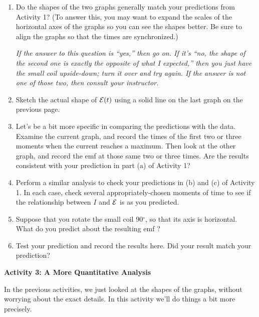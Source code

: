 \begin{enumerate}[labparts]
\item Do the shapes of the
two graphs generally match your predictions from Activity 1? (To answer this, you may want to expand the scales of the horizontal axes of the graphs so you can see the shapes better.  Be sure to align the graphs so that the times are synchronized.) 

\answerspace{1in}

\textit{If the answer to this question is ``yes,'' then go on.  If it's ``no,
the shape of the second one is exactly the opposite of what I expected,''
then you just have the small coil upside-down; turn it over and 
try again.  If the answer is not one of those two, then consult your 
instructor.}

\item  Sketch the actual shape of ${\cal E}(t)$ using a solid line on the last graph on the previous page.
\medskip

\item  Let's be a bit more specific in comparing the predictions
with the data.  Examine the current graph, and record the
times of the first two or three moments when the current reaches a maximum.
Then look at the other graph, and record the emf at those same two or three times.
Are the results consistent with your prediction in part (a) of Activity 1?

\answerspace{0.9in}

\item  Perform a similar analysis to check your predictions in (b) and (c) of Activity 1.
In each case, check several appropriately-chosen moments of time to see
if the relationship between $I$ and ${\cal E}$ is as you predicted.

\answerspace{1in}

\item  Suppose that you rotate the small coil 90$^\circ$, so that its axis
is horizontal.  What do you predict about the resulting emf ?
\answerspace{0.8in}

\item  Test your prediction and record the results here.  Did your result match your prediction?
\answerspace{0.8in}
\end{enumerate}

\pagebreak[2]

\textbf{Activity 3: A More Quantitative Analysis}

In the previous activities, we just looked at the shapes of the graphs, without worrying
about the exact details.  In this activity we'll do things a bit more precisely.

